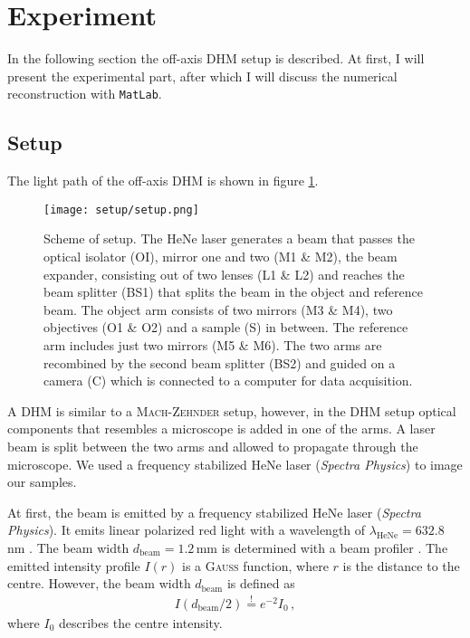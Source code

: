 \documentclass{article}
\begin{document}

\section{Experiment}
In the following section the off-axis DHM setup is described. At first, I will present the experimental part, after which I will discuss the numerical reconstruction with \texttt{MatLab}.

\subsection{Setup}
The light path of the off-axis DHM is shown in figure \ref{fig:scheme}. 
\begin{figure}[h!]
    \centering
    \texttt{[image: setup/setup.png]}
    \caption{Scheme of setup. The HeNe laser generates a beam that passes the optical isolator (OI), mirror one and two (M1 \& M2), the beam expander, consisting out of two lenses (L1 \& L2) and reaches the beam splitter (BS1) that splits the beam in the object and reference beam. The object arm consists of two mirrors (M3 \& M4), two objectives (O1 \& O2) and a sample (S) in between. The reference arm includes just two mirrors (M5 \& M6). The two arms are recombined by the second beam splitter (BS2) and guided on a camera (C) which is connected to a computer for data acquisition. }
    \label{fig:scheme}
\end{figure}
A DHM is similar to a \textsc{Mach}-\textsc{Zehnder} setup, however, in the DHM setup optical components that resembles a microscope is added in one of the arms. A laser beam is split between the two arms and allowed to propagate through the microscope. We used a  frequency stabilized HeNe laser (\textit{Spectra Physics}) to image our samples.

At first, the beam is emitted by a frequency stabilized HeNe laser (\textit{Spectra Physics}). It emits linear polarized red light with a wavelength of $\lambda_\text{HeNe}=632.8\,$nm \cite{handbook}. The beam width $d_\text{beam}=1.2\,$mm is determined with a beam profiler \cite{beamprofiler}. The emitted intensity profile $I(r)$ is a \textsc{Gauss} function, where $r$ is the distance to the centre. However, the beam width $d_\text{beam}$ is defined as
\begin{align}
    I(d_\text{beam}/2)\overset{!}{=}e^{-2}I_0\,,
\end{align}
where $I_0$ describes the centre intensity.
\end{document}
